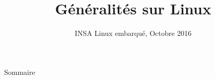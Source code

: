 \documentclass{beamer}
\title[Linux - Généralités]
{Généralités sur Linux}
\date[Octobre 2016]
{INSA Linux embarqué, Octobre 2016}
\begin{document}
\begin{frame}
  \titlepage
\end{frame}

\begin{frame}{Sommaire}
  \tableofcontents
\end{frame}










\end{document}
